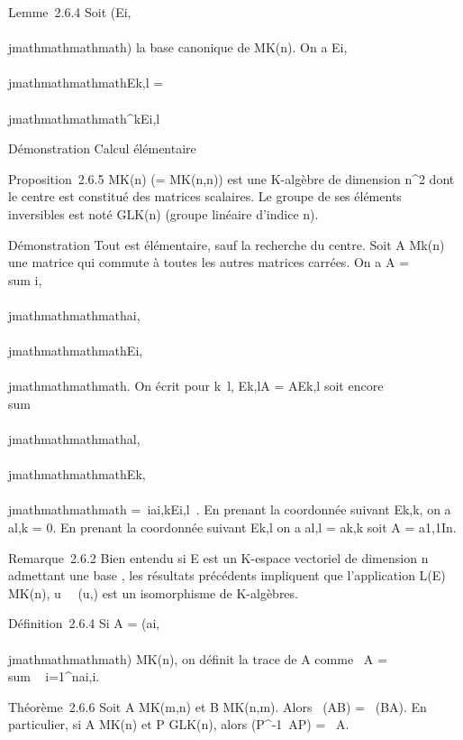 Lemme~2.6.4 Soit (Ei,\\\\jmathmathmathmath) la base canonique de MK(n).
On a Ei,\\\\jmathmathmathmathEk,l = \delta\\\\jmathmathmathmath^kEi,l

Démonstration Calcul élémentaire

Proposition~2.6.5 MK(n) (= MK(n,n)) est une
K-algèbre de dimension n^2 dont le centre est constitué des
matrices scalaires. Le groupe de ses éléments inversibles est noté
GLK(n) (groupe linéaire d'indice n).

Démonstration Tout est élémentaire, sauf la recherche du centre. Soit A
\in Mk(n) une matrice qui commute à toutes les autres matrices
carrées. On a A =\ \\sum
 i,\\\\jmathmathmathmathai,\\\\jmathmathmathmathEi,\\\\jmathmathmathmath. On écrit pour
k\neq~l, Ek,lA = AEk,l soit
encore \\sum ~
\\\\jmathmathmathmathal,\\\\jmathmathmathmathEk,\\\\jmathmathmathmath =\
\sum  iai,kEi,l~. En
prenant la coordonnée suivant Ek,k, on a al,k = 0.
En prenant la coordonnée suivant Ek,l on a al,l =
ak,k soit A = a1,1In.

Remarque~2.6.2 Bien entendu si E est un K-espace vectoriel de dimension
n admettant une base \mathcal{E}, les résultats précédents impliquent que
l'application L(E) \rightarrow~ MK(n),
u\mapsto~\mathrmMat~
(u,) est un isomorphisme de K-algèbres.

Définition~2.6.4 Si A = (ai,\\\\jmathmathmathmath) \in MK(n), on définit
la trace de A comme
~A
= \\sum ~
i=1^nai,i.

Théorème~2.6.6 Soit A \in MK(m,n) et B \in MK(n,m).
Alors ~(AB)
= ~(BA). En
particulier, si A \in MK(n) et P \in GLK(n), alors
(P^-1~AP)
= \mathrm{tr}~A.

